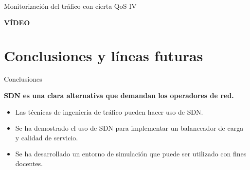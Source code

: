 \documentclass[10pt,spanish,xcolor={svgnames}]{beamer}
\begin{document}
\begin{frame}{Monitorización del tráfico con cierta QoS IV}
\begin{alertblock}{\centering \Huge \textbf{VÍDEO}}
\end{alertblock}
\end{frame}







\section{Conclusiones y líneas futuras}
\begin{frame}{Conclusiones}
\vspace*{1em}
\large
\begin{alertblock}{\Large \textbf{SDN es una clara alternativa que demandan los operadores de red.}}
\vspace{1em}
\begin{itemize}
\item Las técnicas de ingeniería de tráfico pueden hacer uso de SDN.
\item  Se ha demostrado el uso de SDN para implementar un balanceador de carga y calidad de servicio.
\item Se ha desarrollado un entorno de simulación que puede ser utilizado con fines docentes.
\end{itemize}
\end{alertblock}
\end{frame}
\end{document}

